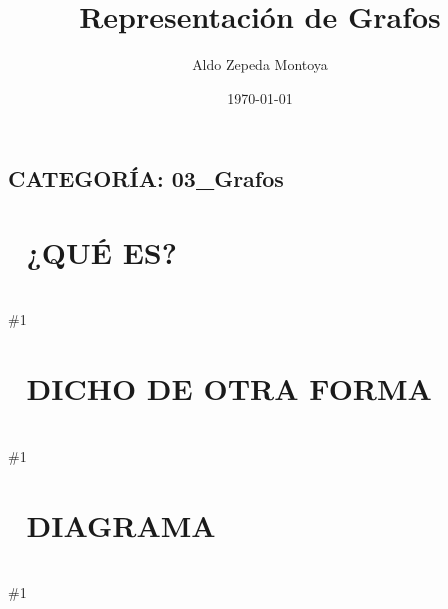 \documentclass{article}
\newcommand{\quees}[1]{
    \section*{🤔 ¿QUÉ ES?}
    \hrulefill \\
    \#1
}
\newcommand{\dichodeotraforma}[1]{
    \section*{💬 DICHO DE OTRA FORMA}
    \hrulefill \\
    \#1
}
\newcommand{\diagrama}[1]{
    \section*{🎨 DIAGRAMA}
    \hrulefill \\
    \#1
}
\begin{document}
\title{Representación de Grafos}
\author{Aldo Zepeda Montoya}
\date{\today}
\maketitle

\subsection*{CATEGORÍA: 03\_Grafos}

\quees{
Un mapa de ciudades 🗺️ con carreteras entre ellas. 

En computación, las ciudades se llaman Nodos (o Vértices) y las 
carreteras se llaman Aristas (o Edges). Un grafo es simplemente un 
conjunto de nodos conectados entre sí. 

Puedes tener:
- Grafos Dirigidos: Carreteras de un solo sentido (A → B).
- Grafos No Dirigidos: Carreteras de doble sentido (A ↔ B).
- Grafos Ponderados: Carreteras con costo o distancia (A --5--> B).
}

\dichodeotraforma{
Un Grafo G = (V, E) es una estructura no lineal. Para trabajar con 
ellos en código, necesitamos guardarlos en memoria de alguna forma. 

Las dos formas más comunes son:
1. Adjacency Matrix (Matriz de Adyacencia): Una tabla de V x V.
2. Adjacency List (Lista de Adyacencia): Un array de listas.

La elección depende de si el grafo es "Denso" (muchas conexiones) o 
"Disperso" (pocas conexiones).
}

\diagrama{\begin{verbatim}
Grafo de ejemplo: A-B, A-C, B-C, C-D

Adjacency Matrix (4x4):      Adjacency List:
     A  B  C  D              A: [B, C]
  A [0, 1, 1, 0]             B: [A, C]
  B [1, 0, 1, 0]             C: [A, B, D]
  C [1, 1, 0, 1]             D: [C]
  D [0, 0, 1, 0]

- En la Matrix: 1 significa que hay conexión, 0 que no.
- En la List: Cada nodo tiene su propia lista de vecinos.
\end{verbatim}}
\end{document}
